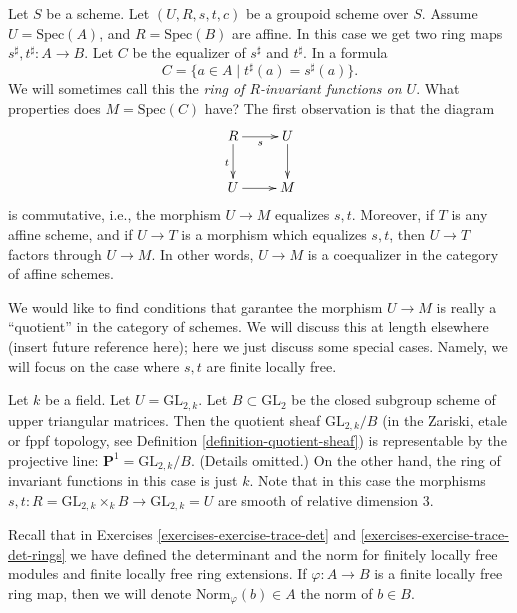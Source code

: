 \noindent
Let $S$ be a scheme.
Let $(U, R, s, t, c)$ be a groupoid scheme over $S$.
Assume $U = \text{Spec}(A)$, and $R = \text{Spec}(B)$ are affine.
In this case we get two ring maps
$s^\sharp, t^\sharp : A \longrightarrow B$.
Let $C$ be the equalizer of $s^\sharp$ and $t^\sharp$. In a formula
\begin{equation}
\label{equation-invariants}
C = \{a \in A \mid t^\sharp(a) = s^\sharp(a) \}.
\end{equation}
We will sometimes call this the {\it ring of $R$-invariant functions on $U$}.
What properties does $M = \text{Spec}(C)$ have? The first observation is
that the diagram
$$
\xymatrix{
R \ar[r]_s \ar[d]_t & U \ar[d] \\
U \ar[r] & M
}
$$
is commutative, i.e., the morphism $U \to M$ equalizes $s, t$.
Moreover, if $T$ is any affine scheme, and if $U \to T$ is
a morphism which equalizes $s, t$, then $U \to T$ factors through $U \to M$.
In other words, $U \to M$ is a coequalizer in the category of affine schemes.

\medskip\noindent
We would like to find conditions that garantee the morphism $U \to M$ is
really a ``quotient'' in the category of schemes. We will discuss this at
length elsewhere (insert future reference here); here we just discuss some
special cases. Namely, we will focus on the case where $s, t$ are finite
locally free.

\begin{example}
\label{example-quotient-projective-line}
Let $k$ be a field. Let $U = \text{GL}_{2, k}$. Let $B \subset \text{GL}_2$
be the closed subgroup scheme of upper triangular matrices. 
Then the quotient sheaf $\text{GL}_{2,k}/B$ (in the Zariski, etale or
fppf topology, see Definition \ref{definition-quotient-sheaf}) is
representable by the projective line: $\mathbf{P}^1 = \text{GL}_{2,k}/B$.
(Details omitted.)
On the other hand, the ring of invariant functions in this case is just $k$.
Note that in this case the morphisms
$s, t : R = \text{GL}_{2, k} \times_k B \to \text{GL}_{2, k} = U$ are smooth
of relative dimension $3$.
\end{example}

\noindent
Recall that in Exercises \ref{exercises-exercise-trace-det}
and \ref{exercises-exercise-trace-det-rings} we have defined the determinant
and the norm for finitely locally free modules and finite locally free ring
extensions. If $\varphi : A \to B$ is a finite locally free ring map, then
we will denote $\text{Norm}_\varphi(b) \in A$ the norm of $b \in B$.

